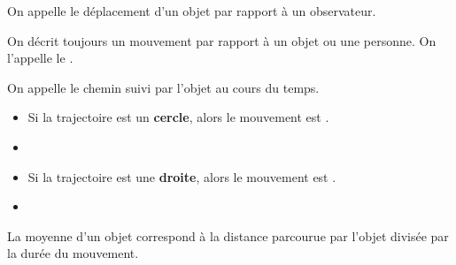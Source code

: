 \documentclass[11pt,a4paper]{article}
\begin{document}
\pagination



On appelle  le déplacement d’un objet par rapport à un observateur.

On décrit toujours un mouvement par rapport à un objet ou une personne. On l’appelle le .

On appelle  le chemin suivi par l’objet au cours du temps.

\begin{itemize}
    \item Si la trajectoire est un \textbf{cercle}, alors le mouvement est .
    \item[] 
    \item Si la trajectoire est une \textbf{droite}, alors le mouvement est .
    \item[]  
\end{itemize}


La  moyenne d’un objet correspond à la distance parcourue par l’objet divisée par la durée du mouvement.

\end{document}
